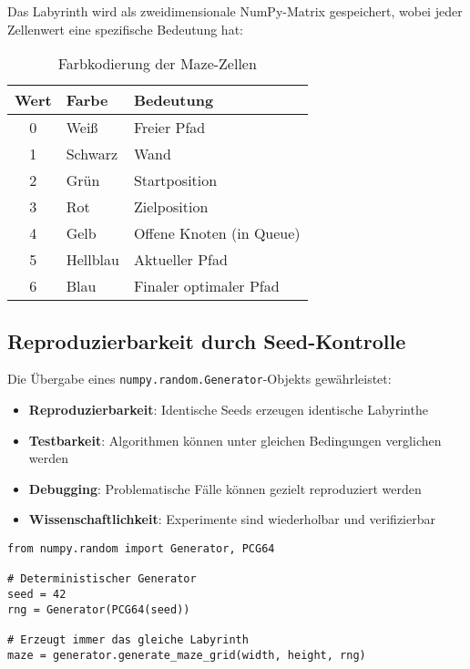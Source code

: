 \documentclass[12pt,a4paper]{article}
\begin{document}
Das Labyrinth wird als zweidimensionale NumPy-Matrix gespeichert, wobei jeder Zellenwert eine spezifische Bedeutung hat:

\begin{table}[H]
\centering
\begin{tabular}{cll}
\toprule
\textbf{Wert} & \textbf{Farbe} & \textbf{Bedeutung} \\
\midrule
0 & Weiß & Freier Pfad \\
1 & Schwarz & Wand \\
2 & Grün & Startposition \\
3 & Rot & Zielposition \\
4 & Gelb & Offene Knoten (in Queue) \\
5 & Hellblau & Aktueller Pfad \\
6 & Blau & Finaler optimaler Pfad \\
\bottomrule
\end{tabular}
\caption{Farbkodierung der Maze-Zellen}
\end{table}

\subsection{Reproduzierbarkeit durch Seed-Kontrolle}

Die Übergabe eines \texttt{numpy.random.Generator}-Objekts gewährleistet:

\begin{itemize}
    \item \textbf{Reproduzierbarkeit}: Identische Seeds erzeugen identische Labyrinthe
    \item \textbf{Testbarkeit}: Algorithmen können unter gleichen Bedingungen verglichen werden
    \item \textbf{Debugging}: Problematische Fälle können gezielt reproduziert werden
    \item \textbf{Wissenschaftlichkeit}: Experimente sind wiederholbar und verifizierbar
\end{itemize}

\begin{lstlisting}[caption={Beispiel für deterministische Maze-Generierung}]
from numpy.random import Generator, PCG64

# Deterministischer Generator
seed = 42
rng = Generator(PCG64(seed))

# Erzeugt immer das gleiche Labyrinth
maze = generator.generate_maze_grid(width, height, rng)
\end{lstlisting}
\end{document}
